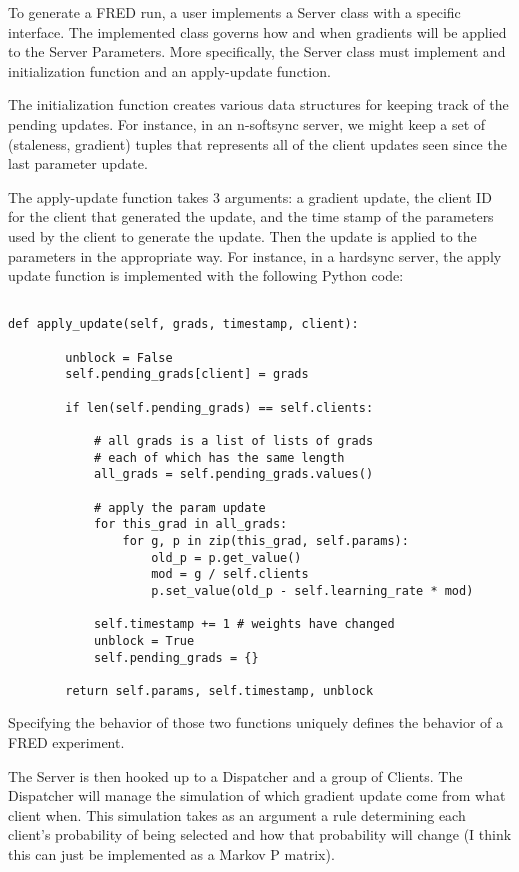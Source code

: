 \documentclass{article} %
\begin{document}
To generate a FRED run, a user implements a Server class with a specific interface.
The implemented class governs how and when gradients will be applied to the Server Parameters.
More specifically, the Server class must implement and initialization function and an apply-update function.

The initialization function creates various data structures for keeping track of the pending updates.
For instance, in an n-softsync server, we might keep a set of (staleness, gradient) tuples that represents
all of the client updates seen since the last parameter update.

The apply-update function takes 3 arguments: a gradient update, the client ID for the client that generated
the update, and the time stamp of the parameters used by the client to generate the update.
Then the update is applied to the parameters in the appropriate way.
For instance, in a hardsync server, the apply update function is implemented with the
following Python code:

\begin{verbatim}

def apply_update(self, grads, timestamp, client):

        unblock = False
        self.pending_grads[client] = grads

        if len(self.pending_grads) == self.clients:

            # all grads is a list of lists of grads
            # each of which has the same length
            all_grads = self.pending_grads.values()

            # apply the param update
            for this_grad in all_grads:
                for g, p in zip(this_grad, self.params):
                    old_p = p.get_value()
                    mod = g / self.clients 
                    p.set_value(old_p - self.learning_rate * mod)

            self.timestamp += 1 # weights have changed
            unblock = True
            self.pending_grads = {}

        return self.params, self.timestamp, unblock
\end{verbatim}

Specifying the behavior of those two functions uniquely defines the behavior of a
FRED experiment.

The Server is then hooked up to a Dispatcher and a group of Clients.
The Dispatcher will manage the simulation of which gradient update come from what client when.
This simulation takes as an argument a rule determining each client's probability of being selected
and how that probability will change (I think this can just be implemented as a Markov P matrix). 
\end{document}
